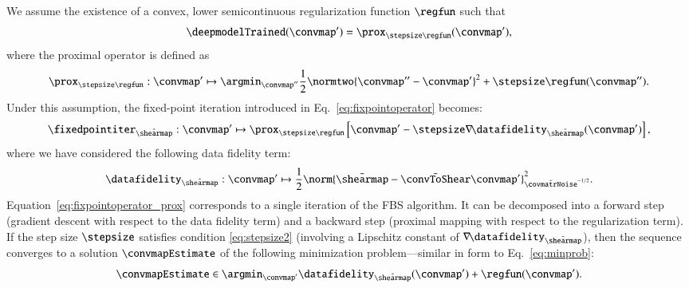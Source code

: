 \documentclass{aa}
\begin{document}
We assume the existence of a convex, lower semicontinuous regularization function $\regfun$ such that
\begin{equation}
    \deepmodelTrained(\convmap') = \prox_{\stepsize\regfun}(\convmap'),
\label{eq:deepmodelasprox}
\end{equation}
where the proximal operator is defined as
\begin{equation}
    \prox_{\stepsize\regfun}: \convmap' \mapsto \argmin_{\convmap''} \frac12 \normtwo{\convmap'' - \convmap'}^2 + \stepsize\regfun(\convmap'').
\end{equation}
Under this assumption, the fixed-point iteration introduced in Eq.~\eqref{eq:fixpointoperator} becomes:
\begin{equation}
    \fixedpointiter_{\tilde\shearmap}: \convmap' \mapsto \prox_{\stepsize\regfun}\left[
        \convmap' - \stepsize\nabla\!\datafidelity_{\tilde\shearmap}(\convmap')
    \right],
\label{eq:fixpointoperator_prox}
\end{equation}
where we have considered the following data fidelity term:
\begin{equation}
    \datafidelity_{\tilde\shearmap}: \convmap' \mapsto \frac12\norm{\tilde\shearmap - \tilde\convToShear\convmap'}_{\tilde\covmatrNoise^{-1/2}}^2.
\label{eq:datafidelity}
\end{equation}
Equation~\eqref{eq:fixpointoperator_prox} corresponds to a single iteration of the FBS algorithm.
It can be decomposed into a forward step (gradient descent with respect to the data fidelity term) and a backward step (proximal mapping with respect to the regularization term).
If the step size $\stepsize$ satisfies condition \eqref{eq:stepsize2} (involving a Lipschitz constant of $\nabla\!\datafidelity_{\tilde\shearmap}$), then the sequence converges to a solution $\convmapEstimate$ of the following minimization problem---similar in form to Eq.~\eqref{eq:minprob}:
\begin{equation}
    \convmapEstimate \in \argmin_{\convmap'} \datafidelity_{\tilde\shearmap}(\convmap') + \regfun(\convmap').
\label{eq:minprob2}
\end{equation}
\end{document}
